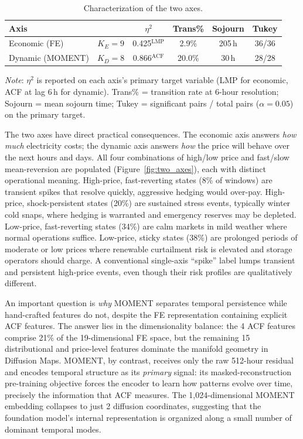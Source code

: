 \documentclass[12pt]{article}
\begin{document}
\begin{table}[H]
\centering
\caption{Characterization of the two axes.}
\label{tab:comparison}
\small
\begin{tabular}{lccccc}
\toprule
Axis & & $\eta^2$ & Trans\% & Sojourn & Tukey \\
\midrule
Economic (FE)   & $K_E = 9$ & 0.425$^\text{LMP}$  & 2.9\%  & 205\,h & 36/36 \\
Dynamic (MOMENT) & $K_D = 8$ & 0.866$^\text{ACF}$  & 20.0\% & 30\,h  & 28/28 \\
\bottomrule
\end{tabular}

\medskip
\small
\textit{Note}: $\eta^2$ is reported on each axis's primary target variable (LMP for economic, ACF at lag 6\,h for dynamic).
Trans\% = transition rate at 6-hour resolution; Sojourn = mean sojourn time; Tukey = significant pairs / total pairs ($\alpha = 0.05$) on the primary target.
\end{table}

The two axes have direct practical consequences.
The economic axis answers \emph{how much} electricity costs; the dynamic axis answers \emph{how} the price will behave over the next hours and days.
All four combinations of high/low price and fast/slow mean-reversion are populated (Figure~\ref{fig:two_axes}), each with distinct operational meaning.
High-price, fast-reverting states (8\% of windows) are transient spikes that resolve quickly, aggressive hedging would over-pay.
High-price, shock-persistent states (20\%) are sustained stress events, typically winter cold snaps, where hedging is warranted and emergency reserves may be depleted.
Low-price, fast-reverting states (34\%) are calm markets in mild weather where normal operations suffice.
Low-price, sticky states (38\%) are prolonged periods of moderate or low prices where renewable curtailment risk is elevated and storage operators should charge.
A conventional single-axis ``spike'' label lumps transient and persistent high-price events, even though their risk profiles are qualitatively different.


An important question is \emph{why} MOMENT separates temporal persistence while hand-crafted features do not, despite the FE representation containing explicit ACF features.
The answer lies in the dimensionality balance: the 4 ACF features comprise 21\% of the 19-dimensional FE space, but the remaining 15 distributional and price-level features dominate the manifold geometry in Diffusion Maps.
MOMENT, by contrast, receives only the raw 512-hour residual and encodes temporal structure as its \emph{primary} signal: its masked-reconstruction pre-training objective forces the encoder to learn how patterns evolve over time, precisely the information that ACF measures.
The 1,024-dimensional MOMENT embedding collapses to just 2 diffusion coordinates, suggesting that the foundation model's internal representation is organized along a small number of dominant temporal modes.
\end{document}

